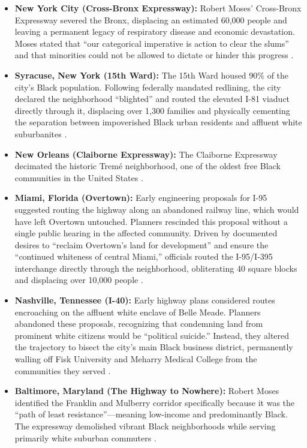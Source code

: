 \begin{itemize}
\tightlist
\item \textbf{New York City (Cross-Bronx Expressway):} Robert Moses' Cross-Bronx Expressway severed the Bronx, displacing an estimated 60,000 people and leaving a permanent legacy of respiratory disease and economic devastation. Moses stated that ``our categorical imperative is action to clear the slums'' and that minorities could not be allowed to dictate or hinder this progress \cite{tel_crossbronx}.
\item \textbf{Syracuse, New York (15th Ward):} The 15th Ward housed 90\% of the city's Black population. Following federally mandated redlining, the city declared the neighborhood ``blighted'' and routed the elevated I-81 viaduct directly through it, displacing over 1,300 families and physically cementing the separation between impoverished Black urban residents and affluent white suburbanites \cite{tel_aclu_i81}.
\item \textbf{New Orleans (Claiborne Expressway):} The Claiborne Expressway decimated the historic Trem\'{e} neighborhood, one of the oldest free Black communities in the United States \cite{tel_claiborne}.
\item \textbf{Miami, Florida (Overtown):} Early engineering proposals for I-95 suggested routing the highway along an abandoned railway line, which would have left Overtown untouched. Planners rescinded this proposal without a single public hearing in the affected community. Driven by documented desires to ``reclaim Overtown's land for development'' and ensure the ``continued whiteness of central Miami,'' officials routed the I-95/I-395 interchange directly through the neighborhood, obliterating 40 square blocks and displacing over 10,000 people \cite{tel_overtown}.
\item \textbf{Nashville, Tennessee (I-40):} Early highway plans considered routes encroaching on the affluent white enclave of Belle Meade. Planners abandoned these proposals, recognizing that condemning land from prominent white citizens would be ``political suicide.'' Instead, they altered the trajectory to bisect the city's main Black business district, permanently walling off Fisk University and Meharry Medical College from the communities they served \cite{tel_nashville}.
\item \textbf{Baltimore, Maryland (The Highway to Nowhere):} Robert Moses identified the Franklin and Mulberry corridor specifically because it was the ``path of least resistance''---meaning low-income and predominantly Black. The expressway demolished vibrant Black neighborhoods while serving primarily white suburban commuters \cite{tel_baltimore}.
\end{itemize}

